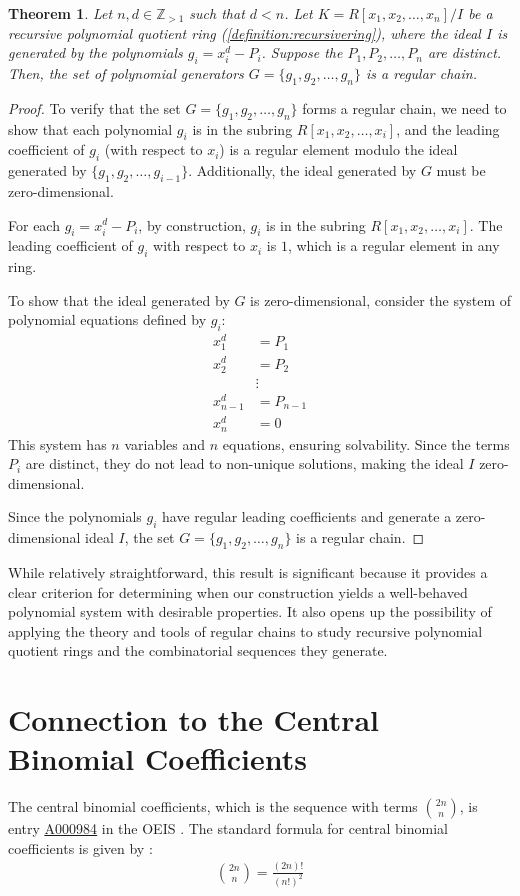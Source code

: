 \documentclass[12pt,reqno]{article}
\theoremstyle{plain}
\newtheorem{theorem}{Theorem}
\newcommand{\seqnum}[1]{\href{https://oeis.org/#1}{\rm \underline{#1}}}
\begin{document}
\begin{theorem} \label{proof:regularchain}
Let $n,d \in \mathbb{Z}_{>1}$ such that $d < n$. Let $K = R[x_1, x_2, \ldots, x_n]/I$ be a recursive polynomial quotient ring (\cref{definition:recursivering}), where the ideal $I$ is generated by the polynomials $g_i = x_i^d - P_i$. Suppose the $P_1, P_2, \ldots, P_n$ are distinct. Then, the set of polynomial generators $G = \{ g_1, g_2, \ldots, g_n \}$ is a regular chain.
\end{theorem}
\begin{proof}
To verify that the set $G = \{ g_1, g_2, \ldots, g_n \}$ forms a regular chain, we need to show that each polynomial $g_i$ is in the subring $R[x_1, x_2, \ldots, x_i]$, and the leading coefficient of $g_i$ (with respect to $x_i$) is a regular element modulo the ideal generated by $\{ g_1, g_2, \ldots, g_{i-1} \}$. Additionally, the ideal generated by $G$ must be zero-dimensional.

For each $g_i = x_i^d - P_i$, by construction, $g_i$ is in the subring $R[x_1, x_2, \ldots, x_i]$. The leading coefficient of $g_i$ with respect to $x_i$ is $1$, which is a regular element in any ring.

To show that the ideal generated by $G$ is zero-dimensional, consider the system of polynomial equations defined by $g_i$:
\begin{align*}
    x_1^d &= P_1 \\
    x_2^d &= P_2 \\
    &\vdots \\
    x_{n-1}^d &= P_{n-1} \\
    x_n^d &= 0
\end{align*}
This system has $n$ variables and $n$ equations, ensuring solvability. Since the terms $P_i$ are distinct, they do not lead to non-unique solutions, making the ideal $I$ zero-dimensional.

Since the polynomials $g_i$ have regular leading coefficients and generate a zero-dimensional ideal $I$, the set $G = \{g_1, g_2, \ldots, g_n\}$ is a regular chain.
\end{proof}
While relatively straightforward, this result is significant because it provides a clear criterion for determining when our construction yields a well-behaved polynomial system with desirable properties. It also opens up the possibility of applying the theory and tools of regular chains to study recursive polynomial quotient rings and the combinatorial sequences they generate.

\section{Connection to the Central Binomial Coefficients} \label{section:cbc}
The central binomial coefficients, which is the sequence with terms $\binom{2n}{n}$, is entry \seqnum{A000984} in the OEIS \cite{A000984}. The standard formula for central binomial coefficients is given by \cite{A000984}:
\begin{align*}
    \binom{2n}{n} = \frac{(2n)!}{(n!)^2} 
\end{align*}
\end{document}
